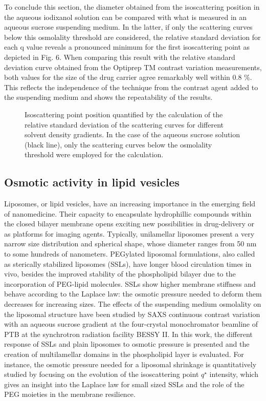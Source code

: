 To conclude this section, the diameter obtained from the isoscattering position in the aqueous iodixanol solution can be compared with what is measured in an aqueous sucrose suspending medium.  In the latter, if only the scattering curves below this osmolality threshold are considered, the relative standard deviation for each q value reveals a pronounced minimum for the first isoscattering point as depicted in Fig. 6. When comparing this result with the relative standard deviation curve obtained from the Optiprep TM contrast variation measurements, both values for the size of the drug carrier agree remarkably well within 0.8 $\%$. This reflects the independence of the technique from the contrast agent added to the suspending medium and shows the repeatability of the results.

\begin{figure}
	\centering
		
		\caption{Isoscattering point position quantified by the calculation of the relative standard deviation of the scattering curves for different solvent density gradients. In the case of the aqueous sucrose solution (black line), only the scattering curves below the osmolality threshold were employed for the calculation.}
		\label{fig:CaelyxIsopointComparison}
\end{figure}

\subsection{Osmotic activity in lipid vesicles}

Liposomes, or lipid vesicles, have an increasing importance in the emerging field of nanomedicine. Their capacity to encapsulate hydrophillic compounds within the closed bilayer membrane opens exciting new possibilities in drug-delivery or as platforms for imaging agents. Typically, unilamellar liposomes present a very narrow size distribution and spherical shape, whose diameter ranges from 50 nm to some hundreds of nanometers. PEGylated liposomal formulations, also called as sterically stabilized liposomes (SSLs), have longer blood circulation times in vivo, besides the improved stability of the phospholipid bilayer due to the incorporation of PEG-lipid molecules. SSLs show higher membrane stiffness and behave according to the Laplace law: the osmotic pressure needed to deform them decreases for increasing sizes. The effects of the suspending medium osmolality on the liposomal structure have been studied by SAXS continuous contrast variation with an aqueous sucrose gradient at the four-crystal monochromator beamline of PTB at the synchrotron radiation facility BESSY II. In this work, the different response of SSLs and plain liposomes to osmotic pressure is presented and the creation of multilamellar domains in the phospholipid layer is evaluated. For instance, the osmotic pressure needed for a liposomal shrinkage is quantitatively studied by focusing on the evolution of the isoscattering point $q^{\star}$ intensity, which gives an insight into the Laplace law for small sized SSLs and the role of the PEG moieties in the membrane resilience.

